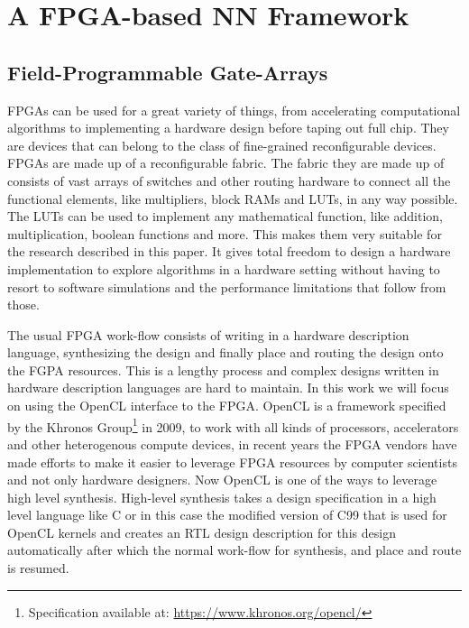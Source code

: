 \documentclass[techrep,english]{ipsj} %
\begin{document}
{\section{A FPGA-based NN Framework}\label{sec:framework}
\subsection{Field-Programmable Gate-Arrays}
FPGAs can be used for a great variety of things, from accelerating computational algorithms to implementing a hardware design before taping out full chip.
They are devices that can belong to the class of fine-grained reconfigurable devices.\\
FPGAs are made up of a reconfigurable fabric.
The fabric they are made up of consists of vast arrays of switches and other routing hardware to connect all the functional elements, like multipliers, block RAMs and LUTs, in any way possible.
The LUTs can be used to implement any mathematical function, like addition, multiplication, boolean functions and more.
This makes them very suitable for the research described in this paper.
It gives total freedom to design a hardware implementation to explore algorithms in a hardware setting without having to resort to software simulations and the performance limitations that follow from those.

The usual FPGA work-flow consists of writing in a hardware description language, synthesizing the design and finally place and routing the design onto the FGPA resources.
This is a lengthy process and complex designs written in hardware description languages are hard to maintain.
In this work we will focus on using the OpenCL interface to the FPGA.
OpenCL is a framework specified by the Khronos Group\footnote{Specification available at: \url{https://www.khronos.org/opencl/}} in 2009, to work with all kinds of processors, accelerators and other heterogenous compute devices, in recent years the FPGA vendors have made efforts to make it easier to leverage FPGA resources by computer scientists and not only hardware designers.
Now OpenCL is one of the ways to leverage high level synthesis.
High-level synthesis takes a design specification in a high level language like C or in this case the modified version of C99 that is used for OpenCL kernels and creates an RTL design description for this design automatically after which the normal work-flow for synthesis, and place and route is resumed.

}
\end{document}
